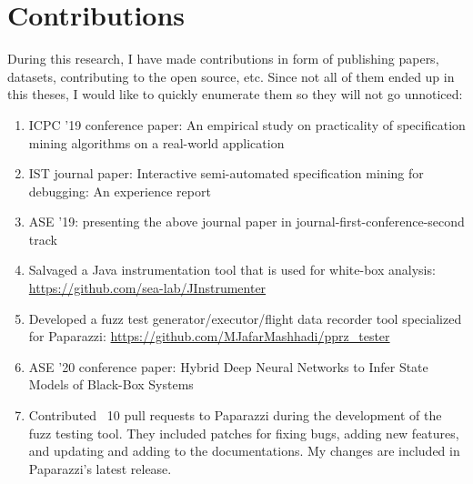 \chapter{Contributions}
During this research, I have made contributions in form of publishing papers, datasets, contributing to the open source, etc. 
Since not all of them ended up in this theses, I would like to quickly enumerate them so they will not go unnoticed:
\begin{enumerate}
    \item ICPC '19 conference paper: An empirical study on practicality of specification mining algorithms on a real-world application
    \item IST journal paper: Interactive semi-automated specification mining for debugging: An experience report
    \item ASE '19: presenting the above journal paper in journal-first-conference-second track
    \item Salvaged a Java instrumentation tool that is used for white-box analysis: \url{https://github.com/sea-lab/JInstrumenter}
    \item Developed a fuzz test generator/executor/flight data recorder tool specialized for Paparazzi: \url{https://github.com/MJafarMashhadi/pprz_tester}
    \item ASE '20 conference paper: Hybrid Deep Neural Networks to Infer State Models of Black-Box Systems
    \item Contributed ~10 pull requests to Paparazzi during the development of the fuzz testing tool. They included patches for fixing bugs, adding new features, and updating and adding to the documentations. My changes are included in Paparazzi's latest release.
\end{enumerate}
